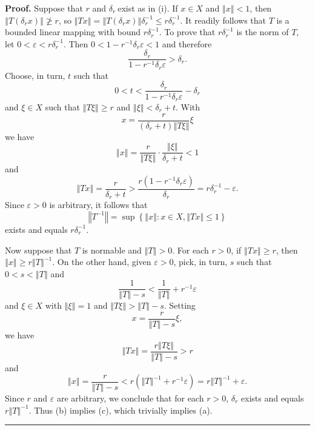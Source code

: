 \documentclass[11pt]{article}%
\newenvironment{proof}[1][Proof]{\noindent\textbf{#1.} }{\ \rule{0.5em}{0.5em}}
\begin{document}
\begin{proof}
Suppose that $r$ and $\delta_{r}\ $exist as in (i). If $x\in X$ and
$\left\Vert x\right\Vert <1$, then $\left\Vert T(\delta_{r}x)\right\Vert
\not \geq r$, so $\left\Vert Tx\right\Vert =\left\Vert T(\delta_{r}%
x)\right\Vert \delta_{r}^{-1}\leq r\delta_{r}^{-1}$. It readily follows that
$T$ is a bounded linear mapping with bound $r\delta_{r}^{-1}$. To prove that
$r\delta_{r}^{-1}$ is the norm of $T$, let $0<\varepsilon<r\delta_{r}^{-1}$.
Then $0<1-r^{-1}\delta_{r}\varepsilon<1$ and therefore%
\[
\frac{\delta_{r}}{1-r^{-1}\delta_{r}\varepsilon}>\delta_{r}.
\]
Choose, in turn, $t$ such that%
\[
0<t<\frac{\delta_{r}}{1-r^{-1}\delta_{r}\varepsilon}-\delta_{r}%
\]
and $\xi\in X$ such that $\left\Vert T\xi\right\Vert \geq r$ and $\left\Vert
\xi\right\Vert <\delta_{r}+t$. With%
\[
x=\frac{r}{\left(  \delta_{r}+t\right)  \left\Vert T\xi\right\Vert }\xi
\]
we have%
\[
\left\Vert x\right\Vert =\frac{r}{\left\Vert T\xi\right\Vert }\cdot
\frac{\left\Vert \xi\right\Vert }{\delta_{r}+t}<1
\]
and%
\[
\left\Vert Tx\right\Vert =\frac{r}{\delta_{r}+t}>\frac{r(1-r^{-1}\delta
_{r}\varepsilon)}{\delta_{r}}=r\delta_{r}^{-1}-\varepsilon.
\]
Since $\varepsilon>0$ is arbitrary, it follows that%
\[
\left\Vert T^{-1}\right\Vert =\sup\left\{  \left\Vert x\right\Vert :x\in
X,\left\Vert Tx\right\Vert \leq1\right\}
\]
exists and equals $r\delta_{r}^{-1}$.

Now suppose that $T$ is normable and $\left\Vert T\right\Vert >0$. For each
$r>0$, if $\left\Vert Tx\right\Vert \geq r$, then $\left\Vert x\right\Vert
\geq r\left\Vert T\right\Vert ^{-1}$. On the other hand, given $\varepsilon
>0$, pick, in turn, $s$ such that $0<s<\left\Vert T\right\Vert $ and%
\[
\frac{1}{\left\Vert T\right\Vert -s}<\frac{1}{\left\Vert T\right\Vert }%
+r^{-1}\varepsilon
\]
and $\xi\in X$ with $\left\Vert \xi\right\Vert =1$ and $\left\Vert
T\xi\right\Vert >\left\Vert T\right\Vert -s$. Setting%
\[
x=\frac{r}{\left\Vert T\right\Vert -s}\xi,
\]
we have%
\[
\left\Vert Tx\right\Vert =\frac{r\left\Vert T\xi\right\Vert }{\left\Vert
T\right\Vert -s}>r
\]
and%
\[
\left\Vert x\right\Vert =\frac{r}{\left\Vert T\right\Vert -s}<r\left(
\left\Vert T\right\Vert ^{-1}+r^{-1}\varepsilon\right)  =r\left\Vert
T\right\Vert ^{-1}+\varepsilon\text{.}%
\]
Since $r$ and $\varepsilon$ are arbitrary, we conclude that for each $r>0$,
$\delta_{r}$ exists and equals $r\left\Vert T\right\Vert ^{-1}$. Thus (b)
implies (c), which trivially implies (a).
\end{proof}

%
\end{document}
